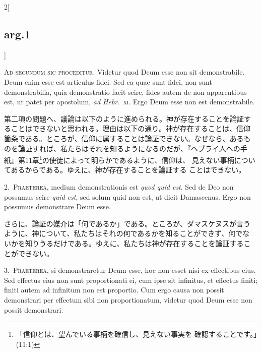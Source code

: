 \documentclass[paper=a4paper,fontsize=10pt,jafontsize=9pt,titlepage]{jlreq}
\begin{document}
\begin{paracol}{2}[\subsection{arg.1}]

{\huge A}{\scshape d secundum sic proceditur}. Videtur quod Deum esse non
sit demonstrabile. Deum enim esse est articulus fidei. Sed ea quae
sunt fidei, non sunt demonstrabilia, quia demonstratio facit scire,
fides autem de non apparentibus est, ut patet per apostolum, {\itshape ad
Hebr}.~{\scshape xi}. Ergo Deum esse non est demonstrabile.

\switchcolumn

第二項の問題へ、議論は以下のように進められる。神が存在することを論証す
ることはできないと思われる。理由は以下の通り。神が存在することは、信仰
箇条である。ところが、信仰に属することは論証できない。なぜなら、あるも
のを論証すれば、私たちはそれを知るようになるのだが、『ヘブライ人への手
紙』第11章\footnote{「信仰とは、望んでいる事柄を確信し、見えない事実を
確認することです。」(11:1)}の使徒によって明らかであるように、信仰は、
見えない事柄についてあるからである。ゆえに、神が存在することを論証する
ことはできない。


2.~{\scshape Praeterea}, medium demonstrationis est {\itshape quod quid
 est}. Sed de Deo non possumus scire {\itshape quid est}, sed solum quid
 non est, ut dicit Damascenus. Ergo non possumus demonstrare Deum
 esse.

\switchcolumn

さらに、論証の媒介は「何であるか」である。ところが、ダマスケヌスが言う
ように、神について、私たちはそれの何であるかを知ることができず、何でな
いかを知りうるだけである。ゆえに、私たちは神が存在することを論証するこ
とができない。


3.~{\scshape Praeterea}, si demonstraretur Deum esse, hoc non esset nisi ex
effectibus eius. Sed effectus eius non sunt proportionati ei, cum ipse
sit infinitus, et effectus finiti; finiti autem ad infinitum non est
proportio. Cum ergo causa non possit demonstrari per effectum sibi non
proportionatum, videtur quod Deum esse non possit demonstrari.


\end{paracol}
\end{document}
